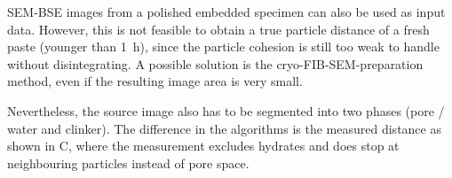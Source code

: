 \ac{SEM}-\ac{BSE} images from a polished embedded specimen can also be used as input data.
However, this is not feasible to obtain a true particle distance of a fresh paste (younger than \qty{1}{\hour}), since the particle cohesion is still too weak to handle without disintegrating.
A possible solution is the cryo-\ac{FIB}-\ac{SEM}-preparation method, even if the resulting image area is very small.

Nevertheless, the source image also has to be segmented into two phases (pore / water and clinker).
The difference in the algorithms is the measured distance as shown in C, where the measurement excludes hydrates and does stop at neighbouring particles instead of pore space.


